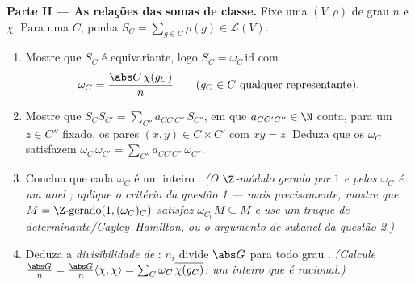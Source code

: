 \begin{problem}
\medskip
\noindent\textbf{Parte II --- As relações das somas de classe.} Fixe
uma  $(V, \rho)$ de grau $n$ e 
$\chi$. Para uma  $C$, ponha $S_C = \sum_{g \in C}\rho(g) \in
\mathcal L(V)$.
\begin{enumerate}[resume]
  \item Mostre que $S_C$ é equivariante, logo $S_C =
        \omega_C\,\mathrm{id}$ com
        \[
        \omega_C = \frac{\abs C\,\chi(g_C)}{n}
        \qquad (g_C \in C \text{ qualquer representante}).
        \]
  \item Mostre que $S_CS_{C'} = \sum_{C''}
        a_{CC'C''}\,S_{C''}$, em que $a_{CC'C''} \in \N$ conta, para um $z \in C''$ fixado, os
        pares $(x, y) \in C \times
        C'$ com $xy = z$. Deduza que os $\omega_C$ satisfazem
        $\omega_C\,\omega_{C'} = \sum_{C''}
        a_{CC'C''}\,\omega_{C''}$.
  \item Conclua que cada $\omega_C$ é um inteiro . \emph{(O
        $\Z$-módulo gerado por $1$ e pelos $\omega_C$ é um anel
        ; aplique o critério da questão 1 --- mais
        precisamente, mostre que $M = \Z\text{-gerado}
        (1, (\omega_C)_C)$ satisfaz $\omega_{C_0} M \subseteq
        M$ e use um truque de
        determinante/Cayley--Hamilton, ou o argumento de subanel da
        questão 2.)}
  \item Deduza a \emph{divisibilidade de }: $n_i$ divide
        $\abs G$ para todo grau . \emph{(Calcule $\frac{\abs G}{n} = \frac{\abs G}{n}
        \langle\chi,\chi\rangle = \sum_C \omega_C\,
        \overline{\chi(g_C)}$:
        um inteiro  que é racional.)}
\end{enumerate}


\end{problem}
